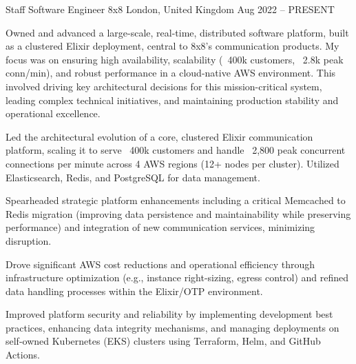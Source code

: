 

\begin{cventries}
  \cventry
    {Staff Software Engineer} %
    {8x8} %
    {London, United Kingdom} %
    {Aug 2022 – PRESENT} %
    {
      \responsibilities %
        {Owned and advanced a large-scale, real-time, distributed software platform, built as a clustered Elixir deployment, central to 8x8's communication products. My focus was on ensuring high availability, scalability (~400k customers, ~2.8k peak conn/min), and robust performance in a cloud-native AWS environment. This involved driving key architectural decisions for this mission-critical system, leading complex technical initiatives, and maintaining production stability and operational excellence.}
      \begin{cvitems} %
        \item {Led the architectural evolution of a core, clustered Elixir communication platform, scaling it to serve ~400k customers and handle ~2,800 peak concurrent connections per minute across 4 AWS regions (12+ nodes per cluster). Utilized Elasticsearch, Redis, and PostgreSQL for data management.}
        \item {Spearheaded strategic platform enhancements including a critical Memcached to Redis migration (improving data persistence and maintainability while preserving performance) and integration of new communication services, minimizing disruption.}
        \columnbreak
        \item {Drove significant AWS cost reductions and operational efficiency through infrastructure optimization (e.g., instance right-sizing, egress control) and refined data handling processes within the Elixir/OTP environment.}
        \item {Improved platform security and reliability by implementing development best practices, enhancing data integrity mechanisms, and managing deployments on self-owned Kubernetes (EKS) clusters using Terraform, Helm, and GitHub Actions.}
      \end{cvitems}
    }


\end{cventries}
